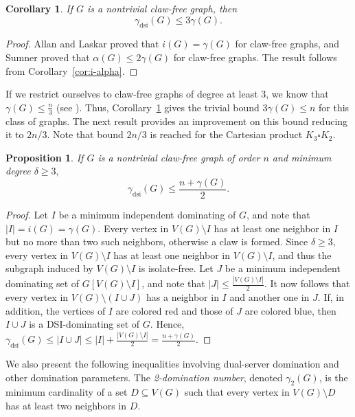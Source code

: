 \documentclass[11pt]{article}
\newtheorem{proposition}[theorem]{Proposition}
\newtheorem{corollary}[theorem]{Corollary}
\theoremstyle{definition}
\theoremstyle{remark}
\newcommand{\dsi}{\mathrm{dsi}}
\begin{document}
\begin{corollary}
\label{cor:claw-free}
If \(G\) is a nontrivial claw-free graph, then
\[
   \gamma_{\dsi}(G)\le 3\gamma(G).
\]
\end{corollary}

\begin{proof}
Allan and Laskar \cite{Allan78} proved that \(i(G)=\gamma(G)\) for
claw-free graphs, and Sumner \cite{Sumner90} proved that
\(\alpha(G)\le 2\gamma(G)\) for claw-free graphs. The result follows from
Corollary~\ref{cor:i-alpha}.
\end{proof}


If we restrict ourselves to claw-free graphs of degree at least 3, we know
that $\gamma(G)\leq\frac{n}{3}$ (see \cite{hhh3}). Thus, Corollary~\ref{cor:claw-free} gives the trivial bound
$3\gamma(G)\leq n$ for this class of graphs. The next result provides an
improvement on this bound reducing it to $2n/3$. Note that bound $2n/3$ is
reached for the Cartesian product $K_{3}\square K_{2}$. 

\begin{proposition}
If $G$ is a nontrivial claw-free graph of order $n$ and minimum degree
$\delta\geq3,$%
\[
\gamma_{\mathrm{dsi}}(G)\leq\frac{n+\gamma(G)}{2}.
\]

\end{proposition}

\begin{proof} Let $I$ be a minimum independent dominating of $G$, and note
that $\left\vert I\right\vert =i(G)=\gamma(G)$. Every vertex in $V(G) \setminus I$
has at least one neighbor in $I$ but no more than two such neighbors, otherwise a claw
is formed. Since $\delta\geq3$, every vertex in $V(G)\setminus I$ has at least
one neighbor in $V(G) \setminus I$, and thus the subgraph induced by $V(G)\setminus
I$ is isolate-free. Let $J$ be a minimum independent dominating set of $G[V(G)\setminus
I]$, and note that $\left\vert J\right\vert \leq\frac{\left\vert V(G)\setminus
I\right\vert }{2}$. It now follows that every vertex in $V(G)\setminus(I\cup
J)$ has a neighbor in $I$ and another one in $J$. If, in addition, the
vertices of $I$ are colored red and those of $J$ are colored blue, then $I \cup
J$ is a DSI-dominating set of $G$. Hence, $\gamma_{\mathrm{dsi}}%
(G)\leq\left\vert I\cup J\right\vert \leq\left\vert I\right\vert
+\frac{\left\vert V(G)\setminus I\right\vert }{2}=\frac{n+\gamma(G)}{2}$.
\end{proof}


We also present the following inequalities involving dual-server domination and other domination
parameters. The  \emph{2-domination number}, denoted \(\gamma_2(G)\), is the minimum
cardinality of a set \(D\subseteq V(G)\) such that every vertex in
\(V(G)\setminus D\) has at least two neighbors in \(D\).
\end{document}
